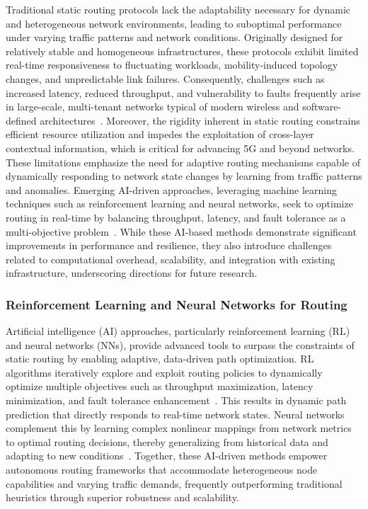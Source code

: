 \documentclass[sigconf]{acmart}
\begin{document}
Traditional static routing protocols lack the adaptability necessary for dynamic and heterogeneous network environments, leading to suboptimal performance under varying traffic patterns and network conditions. Originally designed for relatively stable and homogeneous infrastructures, these protocols exhibit limited real-time responsiveness to fluctuating workloads, mobility-induced topology changes, and unpredictable link failures. Consequently, challenges such as increased latency, reduced throughput, and vulnerability to faults frequently arise in large-scale, multi-tenant networks typical of modern wireless and software-defined architectures~\cite{ref53}. Moreover, the rigidity inherent in static routing constrains efficient resource utilization and impedes the exploitation of cross-layer contextual information, which is critical for advancing 5G and beyond networks. These limitations emphasize the need for adaptive routing mechanisms capable of dynamically responding to network state changes by learning from traffic patterns and anomalies. Emerging AI-driven approaches, leveraging machine learning techniques such as reinforcement learning and neural networks, seek to optimize routing in real-time by balancing throughput, latency, and fault tolerance as a multi-objective problem~\cite{ref53}. While these AI-based methods demonstrate significant improvements in performance and resilience, they also introduce challenges related to computational overhead, scalability, and integration with existing infrastructure, underscoring directions for future research.

\subsubsection{Reinforcement Learning and Neural Networks for Routing}

Artificial intelligence (AI) approaches, particularly reinforcement learning (RL) and neural networks (NNs), provide advanced tools to surpass the constraints of static routing by enabling adaptive, data-driven path optimization. RL algorithms iteratively explore and exploit routing policies to dynamically optimize multiple objectives such as throughput maximization, latency minimization, and fault tolerance enhancement~\cite{ref4}. This results in dynamic path prediction that directly responds to real-time network states. Neural networks complement this by learning complex nonlinear mappings from network metrics to optimal routing decisions, thereby generalizing from historical data and adapting to new conditions~\cite{ref17}\textemdash\cite{ref20}. Together, these AI-driven methods empower autonomous routing frameworks that accommodate heterogeneous node capabilities and varying traffic demands, frequently outperforming traditional heuristics through superior robustness and scalability.
\end{document}
